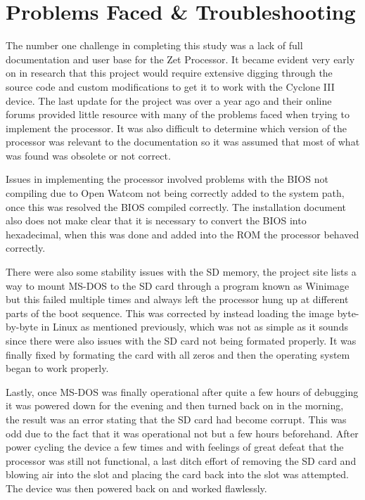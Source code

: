 \documentclass[11pt,peerreviewca]{IEEEtran}
\begin{document}
\section{Problems Faced \& Troubleshooting}
The number one challenge in completing this study was a lack of full documentation and user base for the Zet Processor. It became evident very early on in research that this project would require extensive digging through the source code and custom modifications to get it to work with the Cyclone III device. The last update for the project was over a year ago and their online forums provided little resource with many of the problems faced when trying to implement the processor. It was also difficult to determine which version of the processor was relevant to the documentation so it was assumed that most of what was found was obsolete or not correct.

Issues in implementing the processor involved problems with the BIOS not compiling due to Open Watcom not being correctly added to the system path, once this was resolved the BIOS compiled correctly. The installation document also does not make clear that it is necessary to convert the BIOS into hexadecimal, when this was done and added into the ROM the processor behaved correctly. 

There were also some stability issues with the SD memory, the project site lists a way to mount MS-DOS to the SD card through a program known as Winimage but this failed multiple times and always left the processor hung up at different parts of the boot sequence. This was corrected by instead loading the image byte-by-byte in Linux as mentioned previously, which was not as simple as it sounds since there were also issues with the SD card not being formated properly. It was finally fixed by formating the card with all zeros and then the operating system began to work properly.

Lastly, once MS-DOS was finally operational after quite a few hours of debugging it was powered down for the evening and then turned back on in the morning, the result was an error stating that the SD card had become corrupt. This was odd due to the fact that it was operational not but a few hours beforehand. After power cycling the device a few times and with feelings of great defeat that the processor was still not functional, a last ditch effort of removing the SD card and blowing air into the slot and placing the card back into the slot was attempted. The device was then powered back on and worked flawlessly.
\end{document}
